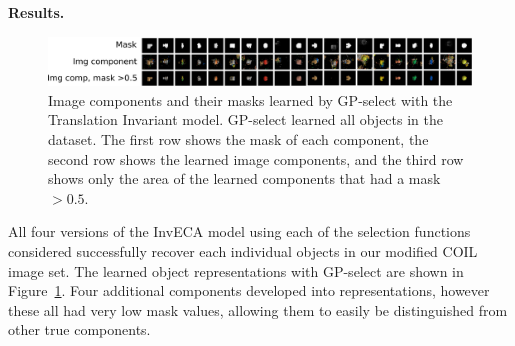 \textbf{Results.}
%
\begin{figure}[t!]%
\centering
\includegraphics[width=\textwidth]{inveca/params_j.pdf}%
\caption{Image components and their masks learned by GP-select with the Translation Invariant model. GP-select learned all objects in the dataset.
The first row shows the mask of each component, %
the second row shows the learned image components, %
and the third row shows only the area of the learned components that had a mask $>0.5$.
}
\label{fig:inveca-params}
\end{figure}
%
All four versions of the InvECA model using each of the selection functions considered successfully recover each individual objects in our modified COIL image set. 
The learned object representations with GP-select are shown in Figure~\ref{fig:inveca-params}. %
Four additional components developed into representations, however these all had very low mask values, allowing them to easily be distinguished from other true components.

